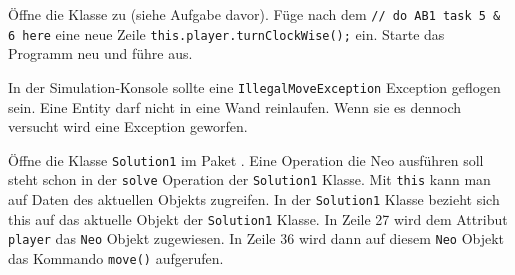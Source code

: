 \begin{questions}

    \renewcommand{\workingtimeMinutes}{5}

    Öffne die Klasse zu  (siehe Aufgabe davor).
    Füge nach dem \texttt{// do AB1 task 5 \& 6 here} eine neue Zeile \texttt{this.player.turnClockWise();} ein.
    Starte das Programm neu und führe  aus.

    In der Simulation-Konsole sollte eine \texttt{IllegalMoveException} Exception geflogen sein.
    Eine Entity darf nicht in eine Wand reinlaufen.
    Wenn sie es dennoch versucht wird eine Exception geworfen.

    \renewcommand{\workingtimeMinutes}{15}

    Öffne die Klasse \texttt{Solution1} im Paket \solutionPackage.
    Eine Operation die Neo ausführen soll steht schon in der \texttt{solve} Operation der \texttt{Solution1} Klasse.
    Mit \texttt{this} kann man auf Daten des aktuellen Objekts zugreifen.
    In der \texttt{Solution1} Klasse bezieht sich this auf das aktuelle Objekt der \texttt{Solution1} Klasse.
    In Zeile 27 wird dem Attribut \texttt{player} das \texttt{Neo} Objekt zugewiesen.
    In Zeile 36 wird dann auf diesem \texttt{Neo} Objekt das Kommando \texttt{move()} aufgerufen.


\end{questions}
